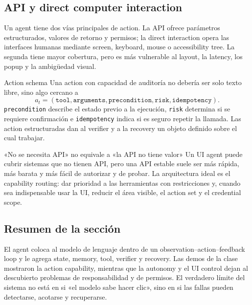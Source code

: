 \subsection{API y direct computer interaction}

Un agent tiene dos vías principales de action. La API ofrece parámetros estructurados, valores de retorno y permisos; la direct interaction opera las interfaces humanas mediante screen, keyboard, mouse o accessibility tree. La segunda tiene mayor cobertura, pero es más vulnerable al layout, la latency, los popup y la ambigüedad visual.


\begin{importantbox}{Action schema}
Una action con capacidad de auditoría no debería ser solo texto libre, sino algo cercano a
\[
a_t=(\texttt{tool},\texttt{arguments},\texttt{precondition},\texttt{risk},\texttt{idempotency}).
\]
\texttt{precondition} describe el estado previo a la ejecución, \texttt{risk} determina si se requiere confirmación e \texttt{idempotency} indica si es seguro repetir la llamada. Las action estructuradas dan al verifier y a la recovery un objeto definido sobre el cual trabajar.
\end{importantbox}


\begin{warningbox}{«No se necesita API» no equivale a «la API no tiene valor»}
Un UI agent puede cubrir sistemas que no tienen API, pero una API estable suele ser más rápida, más barata y más fácil de autorizar y de probar. La arquitectura ideal es el capability routing: dar prioridad a las herramientas con restricciones y, cuando sea indispensable usar la UI, reducir el área visible, el action set y el credential scope.
\end{warningbox}

\subsection{Resumen de la sección}

El agent coloca al modelo de lenguaje dentro de un observation--action--feedback loop y le agrega state, memory, tool, verifier y recovery. Las demos de la clase mostraron la action capability, mientras que la autonomy y el UI control dejan al descubierto problemas de responsabilidad y de permisos. El verdadero límite del sistema no está en si «el modelo sabe hacer clic», sino en si las fallas pueden detectarse, acotarse y recuperarse.
